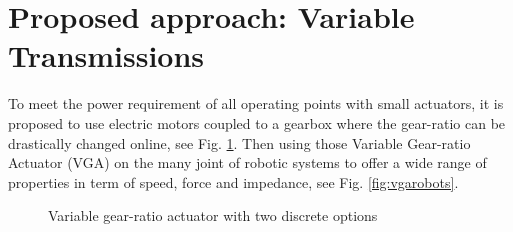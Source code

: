 %




\section{Proposed approach: Variable Transmissions}
\label{sec:ProposedSolutionRobotsUsingMultipleGearRatioActuators}


To meet the power requirement of all operating points with small actuators, it is proposed to use electric motors coupled to a gearbox where the gear-ratio can be drastically changed online, see Fig. \ref{fig:2s}. Then using those Variable Gear-ratio Actuator (VGA) on the many joint of robotic systems to offer a wide range of properties in term of speed, force and impedance, see Fig. \ref{fig:vgarobots}.

\begin{figure}[htb]
        \centering
        \caption{Variable gear-ratio actuator with two discrete options}\label{fig:2s}
\end{figure}

